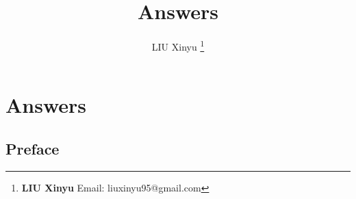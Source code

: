 \documentclass[UTF8]{article}
\begin{document}
\title{Answers}

\author{LIU Xinyu
\thanks{{\bfseries LIU Xinyu} \newline
  Email: liuxinyu95@gmail.com \newline}
  }

\maketitle
\fi


\chapter*{Answers}

\section{Preface}
\end{document}
